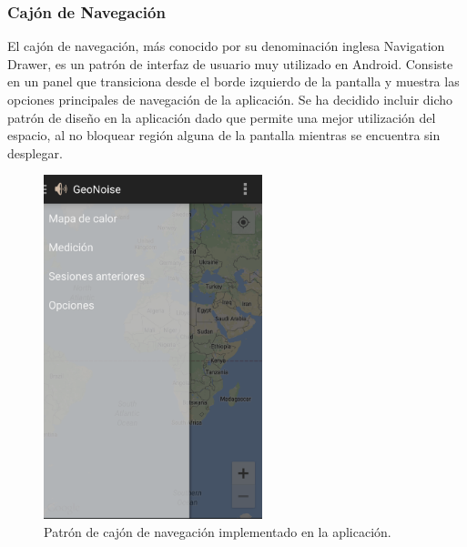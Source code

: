 \subsubsection{Cajón de Navegación}
El cajón de navegación, más conocido por su denominación inglesa Navigation Drawer, es un patrón de interfaz de usuario muy utilizado en Android. Consiste en un panel que transiciona desde el borde izquierdo de la pantalla y muestra las opciones principales de navegación de la aplicación. Se ha decidido incluir dicho patrón de diseño en la aplicación dado que permite una mejor utilización del espacio, al no bloquear región alguna de la pantalla mientras se encuentra sin desplegar.

 \begin{figure}[h] \centering
    \includegraphics[height=10cm]{graphs/navdrawer.png} \caption{Patrón de cajón de navegación implementado en la aplicación.}\label{fig:navdrawer}
\end{figure}

